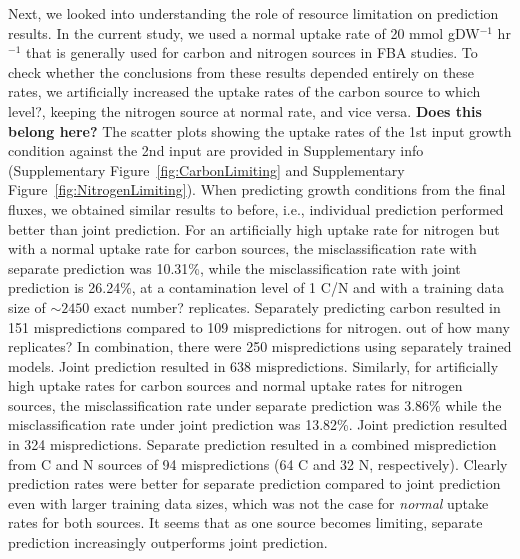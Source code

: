 \documentclass[12pt]{article}
\begin{document}
Next, we looked into understanding the role of resource limitation on prediction results. In the current study, we used a normal uptake rate of 20 mmol gDW$^{-1}$ hr$^{-1}$ that is generally used for carbon and nitrogen sources in FBA studies. To check whether the conclusions from these results depended entirely on these rates, we artificially increased the uptake rates of the carbon source {\color{red}to which level?}, keeping the nitrogen source at normal rate, and vice versa. {\color{red}\textbf{Does this belong here?} The scatter plots showing the uptake rates of the 1st input growth condition against the 2nd input are provided in Supplementary info (Supplementary Figure~\ref{fig:CarbonLimiting} and Supplementary Figure~\ref{fig:NitrogenLimiting}).} When predicting growth conditions from the final fluxes, we obtained similar results to before, i.e., individual prediction performed better than joint prediction. For an artificially high uptake rate for nitrogen but with a normal uptake rate for carbon sources, the misclassification rate with separate prediction was 10.31\%, while the  misclassification rate with joint prediction is 26.24\%, at a contamination level of 1 C/N and with a training data size of $\sim2450$ {\color{red}exact number?} replicates. Separately predicting carbon resulted in 151 mispredictions compared to 109 mispredictions for nitrogen. {\color{red}out of how many replicates?} In combination, there were 250 mispredictions using separately trained models. Joint prediction resulted in 638 mispredictions. Similarly, for artificially high uptake rates for carbon sources and normal uptake rates for nitrogen sources, the misclassification rate under separate prediction was 3.86\% while the misclassification rate under joint prediction was 13.82\%. Joint prediction resulted in 324 mispredictions. Separate prediction resulted in a combined misprediction from C and N sources of 94 mispredictions (64 C and 32 N, respectively). Clearly prediction rates were better for separate prediction compared to joint prediction even with larger training data sizes, which was not the case for \emph{normal} uptake rates for both sources. It seems that as one source becomes limiting, separate prediction increasingly outperforms joint prediction.
\end{document}
